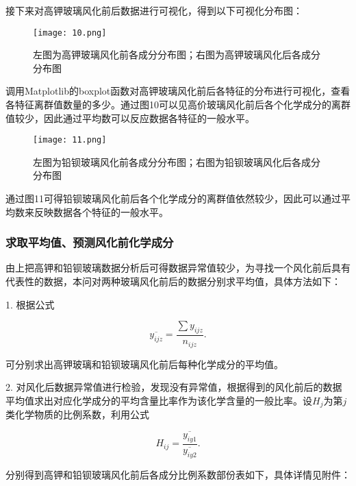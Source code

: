 接下来对高钾玻璃风化前后数据进行可视化，得到以下可视化分布图：

\begin{figure}[H] 
	\centering %
	\texttt{[image: 10.png]} %
	\caption{左图为高钾玻璃风化前各成分分布图；右图为高钾玻璃风化后各成分分布图} %
	\label{Fig.main11} %
\end{figure}

调用Matplotlib的boxplot函数对高钾玻璃风化前后各特征的分布进行可视化，查看各特征离群值数量的多少。通过图10可以见高价玻璃风化前后各个化学成分的离群值较少，因此通过平均数可以反应数据各特征的一般水平。

\begin{figure}[H] 
	\centering %
	\texttt{[image: 11.png]} %
	\caption{左图为铅钡玻璃风化前各成分分布图；右图为铅钡玻璃风化后各成分分布图} %
	\label{Fig.main12} %
\end{figure}

通过图11可得铅钡玻璃风化前后各个化学成分的离群值依然较少，因此可以通过平均数来反映数据各个特征的一般水平。

\subsubsection{求取平均值、预测风化前化学成分}

由上把高钾和铅钡玻璃数据分析后可得数据异常值较少，为寻找一个风化前后具有代表性的数据，本问对两种玻璃风化前后的数据分别求平均值，具体方法如下：

1. 根据公式

\begin{equation}
    \overline{{{y}_{ijz}}}=\frac{\sum{{{y}_{ijz}}}}{{{n}_{ijz}}}.
\end{equation}

可分别求出高钾玻璃和铅钡玻璃风化前后每种化学成分的平均值。

2. 对风化后数据异常值进行检验，发现没有异常值，根据得到的风化前后的数据平均值求出对应化学成分的平均含量比率作为该化学含量的一般比率。设$H_j$为第$j$类化学物质的比例系数，利用公式

\begin{equation}
    {{H}_{ij}}=\frac{\overline{{{y}_{iy1}}}}{\overline{{{y}_{iy2}}}}.
\end{equation}

分别得到高钾和铅钡玻璃风化前后各成分比例系数部份表如下，具体详情见附件：


